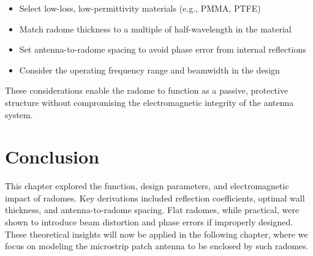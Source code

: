 \begin{itemize}
    \item Select low-loss, low-permittivity materials (e.g., PMMA, PTFE)
    \item Match radome thickness to a multiple of half-wavelength in the material
    \item Set antenna-to-radome spacing to avoid phase error from internal reflections
    \item Consider the operating frequency range and beamwidth in the design
\end{itemize}

These considerations enable the radome to function as a passive, protective structure without compromising the electromagnetic integrity of the antenna system.

\section*{Conclusion}

This chapter explored the function, design parameters, and electromagnetic impact of radomes. Key derivations included reflection coefficients, optimal wall thickness, and antenna-to-radome spacing. Flat radomes, while practical, were shown to introduce beam distortion and phase errors if improperly designed. These theoretical insights will now be applied in the following chapter, where we focus on modeling the microstrip patch antenna to be enclosed by such radomes.
